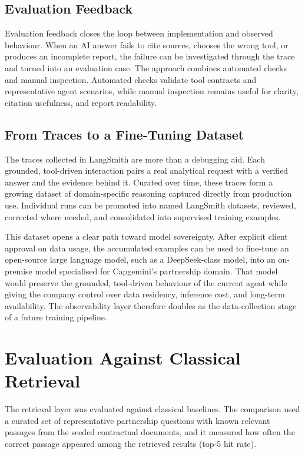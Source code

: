 \subsection{Evaluation Feedback}
\label{subsec:chapter7-evaluation-feedback}

Evaluation feedback closes the loop between implementation and observed behaviour. When an AI answer fails to cite sources, chooses the wrong tool, or produces an incomplete report, the failure can be investigated through the trace and turned into an evaluation case. The approach combines automated checks and manual inspection. Automated checks validate tool contracts and representative agent scenarios, while manual inspection remains useful for clarity, citation usefulness, and report readability.

\subsection{From Traces to a Fine-Tuning Dataset}
\label{subsec:chapter7-traces-dataset}

The traces collected in LangSmith are more than a debugging aid. Each grounded, tool-driven interaction pairs a real analytical request with a verified answer and the evidence behind it. Curated over time, these traces form a growing dataset of domain-specific reasoning captured directly from production use. Individual runs can be promoted into named LangSmith datasets, reviewed, corrected where needed, and consolidated into supervised training examples.

This dataset opens a clear path toward model sovereignty. After explicit client approval on data usage, the accumulated examples can be used to fine-tune an open-source large language model, such as a DeepSeek-class model, into an on-premise model specialised for Capgemini's partnership domain. That model would preserve the grounded, tool-driven behaviour of the current agent while giving the company control over data residency, inference cost, and long-term availability. The observability layer therefore doubles as the data-collection stage of a future training pipeline.

\section{Evaluation Against Classical Retrieval}
\label{sec:chapter7-evals-tests}

The retrieval layer was evaluated against classical baselines. The comparison used a curated set of representative partnership questions with known relevant passages from the seeded contractual documents, and it measured how often the correct passage appeared among the retrieved results (top-5 hit rate).

